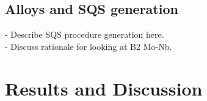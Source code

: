 \documentclass[showpacs,aps,floatfix,prb,reprint,superscriptaddress]{revtex4-1}
\begin{document}

\subsection{Alloys and SQS generation}
- Describe SQS procedure generation here. \\ 
- Discuss rationale for looking at B2 Mo-Nb.

\section{Results and Discussion}
\end{document}
